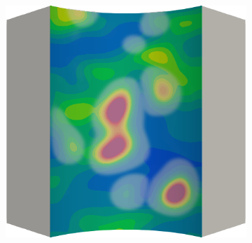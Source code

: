\begin{frame}
\begin{columns}[T]
\begin{column}{0.6\textwidth}
\begin{figure}
{\begin{subfigure}{0.19\textwidth}
          \end{subfigure}
          \hspace{0.06\textwidth}
          \begin{subfigure}{0.19\textwidth}
            \centering
            \includegraphics[width=\textwidth]{Chapter345/figures/ep.0018}
          \end{subfigure}
        }
        

\end{figure}
\end{column}
\end{columns}
\end{frame}
